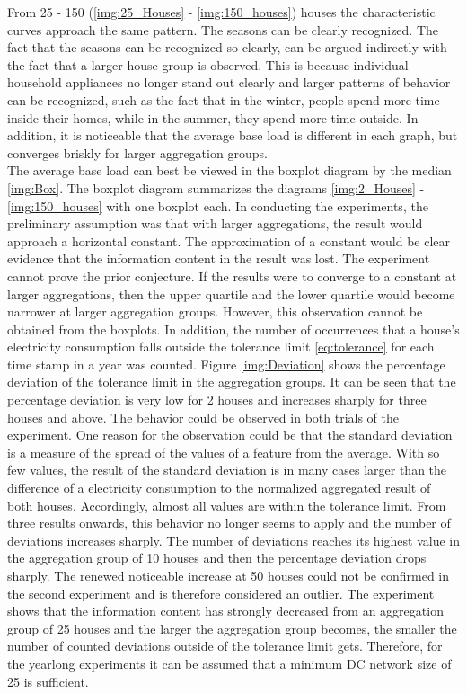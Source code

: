 From 25 - 150 (\ref{img:25_Houses} - \ref{img:150_houses}) houses the characteristic curves approach the same pattern. The seasons can be clearly recognized. The fact that the seasons can be recognized so clearly, can be argued indirectly with the fact that a larger house group is observed. This is because individual household appliances no longer stand out clearly and larger patterns of behavior can be recognized, such as the fact that in the winter, people spend more time inside their homes, while in the summer, they spend more time outside. In addition, it is noticeable that the average base load is different in each graph, but converges briskly for larger aggregation groups. \\
The average base load can best be viewed in the boxplot diagram by the median \ref{img:Box}. The boxplot diagram summarizes the diagrams \ref{img:2_Houses} - \ref{img:150_houses} with one boxplot each. In conducting the experiments, the preliminary assumption was that with larger aggregations, the result would approach a horizontal constant. The approximation of a constant would be clear evidence that the information content in the result was lost. The experiment cannot prove the prior conjecture. If the results were to converge to a constant at larger aggregations, then the upper quartile and the lower quartile would become narrower at larger aggregation groups. However, this observation cannot be obtained from the boxplots. 
In addition, the number of occurrences that a house's electricity consumption falls outside the tolerance limit \ref{eq:tolerance} for each time stamp in a year was counted. Figure \ref{img:Deviation} shows the percentage deviation of the tolerance limit in the aggregation groups. It can be seen that the percentage deviation is very low for 2 houses and increases sharply for three houses and above. The behavior could be observed in both trials of the experiment. One reason for the observation could be that the standard deviation is a measure of the spread of the values of a feature from the average. With so few values, the result of the standard deviation is in many cases larger than the difference of a electricity consumption to the normalized aggregated result of both houses. Accordingly, almost all values are within the tolerance limit. From three results onwards, this behavior no longer seems to apply and the number of deviations increases sharply. The number of deviations reaches its highest value in the aggregation group of 10 houses and then the percentage deviation drops sharply. The renewed noticeable increase at 50 houses could not be confirmed in the second experiment and is therefore considered an outlier. The experiment shows that the information content has strongly decreased from an aggregation group of 25 houses and the larger the aggregation group becomes, the smaller the number of counted deviations outside of the tolerance limit gets. Therefore, for the yearlong experiments it can be assumed that a minimum DC network size of 25 is sufficient.
